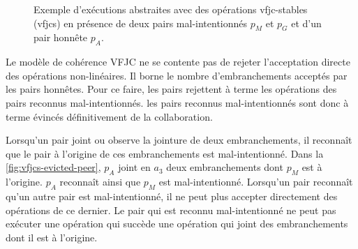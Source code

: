 \begin{figure}[htb]
\centering
{}
\caption[Stabilité \acl{VFJC} en présence de deux pairs mal-intentionnés]{Exemple d'exécutions abstraites avec des opérations vfjc-stables (vfjcs) en présence de deux pairs mal-intentionnés $p_M$ et $p_G$ et d'un pair honnête $p_A$.}\label{fig:vfjcs-two-malicious}
\end{figure}

Le modèle de cohérence \acl{VFJC} ne se contente pas de rejeter l'acceptation directe des opérations non-linéaires.
Il borne le nombre d'embranchements acceptés par les pairs honnêtes.
Pour ce faire, les pairs rejettent à terme les opérations des pairs reconnus mal-intentionnés.
les pairs reconnus mal-intentionnés sont donc à terme évincés définitivement de la collaboration.

Lorsqu'un pair joint ou observe la jointure de deux embranchements, il reconnaît que le pair à l'origine de ces embranchements est mal-intentionné.
Dans la \autoref{fig:vfjcs-evicted-peer}, $p_A$ joint en $a_3$ deux embranchements dont $p_M$ est à l'origine.
$p_A$ reconnaît ainsi que $p_M$ est mal-intentionné.
Lorsqu'un pair reconnaît qu'un autre pair est mal-intentionné, il ne peut plus accepter directement des opérations de ce dernier.
Le pair qui est reconnu mal-intentionné ne peut pas exécuter une opération qui succède une opération qui joint des embranchements dont il est à l'origine.

